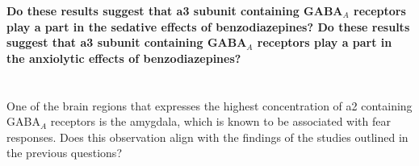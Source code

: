 \documentclass{article}
\begin{document}
\FloatBarrier
\textbf{Do these results suggest that a3 subunit containing GABA$_A$ receptors play a part in the sedative effects of benzodiazepines? Do these results suggest that a3 subunit containing GABA$_A$ receptors play a part in the anxiolytic effects of benzodiazepines?}

\section{}
One of the brain regions that expresses the highest concentration of a2 containing GABA$_A$ receptors is the amygdala, which is known to be associated with fear responses. Does this observation align with the findings of the studies outlined in the previous questions?


\nocite{*}
\printbibliography
\end{document}
